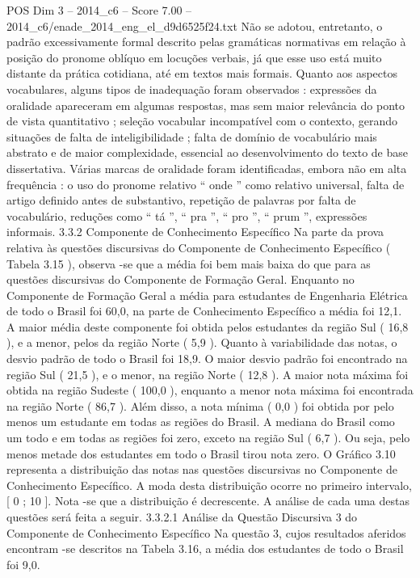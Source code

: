 \begin{textsample}{POS Dim 3 – 2014\_c6 – Score 7.00 – 2014\_c6/enade\_2014\_eng\_el\_d9d6525f24.txt}
Não se adotou, entretanto, o padrão excessivamente formal descrito pelas gramáticas normativas em relação à posição do pronome oblíquo em locuções verbais, já que esse uso está muito distante da prática cotidiana, até em textos mais formais.
Quanto aos aspectos vocabulares, alguns tipos de inadequação foram observados : expressões da oralidade apareceram em algumas respostas, mas sem maior relevância do ponto de vista quantitativo ; seleção vocabular incompatível com o contexto, gerando situações de falta de inteligibilidade ; falta de domínio de vocabulário mais abstrato e de maior complexidade, essencial ao desenvolvimento do texto de base dissertativa.
Várias marcas de oralidade foram identificadas, embora não em alta frequência : o uso do pronome relativo “ onde ” como relativo universal, falta de artigo definido antes de substantivo, repetição de palavras por falta de vocabulário, reduções como “ tá ”, “ pra ”, “ pro ”, “ prum ”, expressões informais. 3.3.2 Componente de Conhecimento Específico Na parte da prova relativa às questões discursivas do Componente de Conhecimento Específico ( Tabela 3.15 ), observa -se que a média foi bem mais baixa do que para as questões discursivas do Componente de Formação Geral.
Enquanto no Componente de Formação Geral a média para estudantes de Engenharia Elétrica de todo o Brasil foi 60,0, na parte de Conhecimento Específico a média foi 12,1.
A maior média deste componente foi obtida pelos estudantes da região Sul ( 16,8 ), e a menor, pelos da região Norte ( 5,9 ).
Quanto à variabilidade das notas, o desvio padrão de todo o Brasil foi 18,9.
O maior desvio padrão foi encontrado na região Sul ( 21,5 ), e o menor, na região Norte ( 12,8 ).
A maior nota máxima foi obtida na região Sudeste ( 100,0 ), enquanto a menor nota máxima foi encontrada na região Norte ( 86,7 ).
Além disso, a nota mínima ( 0,0 ) foi obtida por pelo menos um estudante em todas as regiões do Brasil.
A mediana do Brasil como um todo e em todas as regiões foi zero, exceto na região Sul ( 6,7 ).
Ou seja, pelo menos metade dos estudantes em todo o Brasil tirou nota zero.
O Gráfico 3.10 representa a distribuição das notas nas questões discursivas no Componente de Conhecimento Específico.
A moda desta distribuição ocorre no primeiro intervalo, [ 0 ; 10 ].
Nota -se que a distribuição é decrescente.
A análise de cada uma destas questões será feita a seguir. 3.3.2.1 Análise da Questão Discursiva 3 do Componente de Conhecimento Específico Na questão 3, cujos resultados aferidos encontram -se descritos na Tabela 3.16, a média dos estudantes de todo o Brasil foi 9,0.

\end{textsample}
